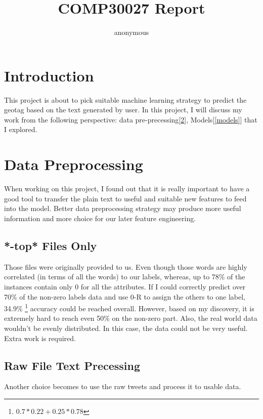 \documentclass[11pt]{article}
\author{anonymous}
\title{COMP30027 Report}
\begin{document}
\maketitle



\section{Introduction}
This project is about to pick suitable machine learning strategy to
predict the geotag based on the text generated by user. In this
project, I will discuss my work from the following perspective:
data pre-precessing[\ref{sec2}], Models[\ref{models}] that I explored.

\section{Data Preprocessing}
\label{sec2}
When working on this project, I found out that it
is really important to have a good tool to transfer the plain text
to useful and suitable new features to feed into the model.
Better data preprocessing strategy may produce more useful information 
and more choice for our later feature engineering.

\subsection{*-top* Files Only}
Those files were originally provided to us. Even though those words
are highly correlated (in terms of all the words) to our labels, 
whereas, up to 78\% of the
instances contain only 0 for all the attributes. If I could 
correctly predict over 70\% of the non-zero labels data and use 
0-R to assign the others to one label, 34.9\%
\footnote{$0.7*0.22+0.25*0.78$} accuracy could be 
reached overall. However, based on my discovery, it is extremely
hard to reach even 50\% on the non-zero part. Also, the real world
data wouldn't be evenly distributed. In this case, the 
data could not be very useful. Extra work is required.

\subsection{Raw File Text Precessing}
Another choice becomes to use the raw tweets and process it to
usable data. 
\end{document}
